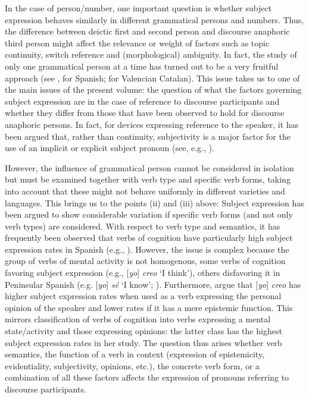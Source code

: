 \documentclass[output=paper]{langscibook}
\begin{document}
In the case of person/number, one important question is whether subject expression behaves similarly in different grammatical persons and numbers. Thus, the difference between deictic first and second person and discourse anaphoric third person might affect the relevance or weight of factors such as topic continuity, switch reference and (morphological) ambiguity. In fact, the study of only one grammatical person at a time has turned out to be a very fruitful approach (see  \citealt{LapidusOtheguy2005, TravisTorresCacoullos2012, LapidusShin2014},  for Spanish; \citealt{HerbeckForthcoming} for Valencian Catalan). This issue takes us to one of the main issues of the present volume: the question of what the factors governing subject expression are in the case of reference to discourse participants and whether they differ from those that have been observed to hold for discourse anaphoric persons. In fact, for devices expressing reference to the speaker, it has been argued that, rather than continuity, subjectivity is a major factor for the use of an implicit or explicit subject pronoun (see, e.g., \citealt{Enríquez1984, AijónOlivaSerrano2010, Posio2011,Posio2018, Hennemann2016, Herbeck2021}).



However, the influence of grammatical person cannot be considered in isolation but must be examined together with verb type and specific verb forms, taking into account that these might not behave uniformly in different varieties and languages. This brings us to the points (ii) and (iii) above: Subject expression has been argued to show considerable variation if specific verb forms (and not only verb types) are considered. With respect to verb type and semantics, it has frequently been observed that verbs of cognition have particularly high  subject expression rates in Spanish (e.g., \citealt{Enríquez1984, Morales1997, Posio2011}). However, the issue is complex because the group of verbs of mental activity is not homogenous, some verbs of cognition favoring  subject expression (e.g., [\textit{yo}] \textit{creo} ‘I think’), others disfavoring it in Peninsular Spanish (e.g. [\textit{yo}] \textit{sé}  ‘I know’; \citealt{Herbeck2021}). Furthermore, \citet{AijónOlivaSerrano2010} argue that [\textit{yo}] \textit{creo}  has higher subject expression rates when used as a verb expressing the personal opinion of the speaker and lower rates if it has a mere epistemic function. This mirrors  classification of verbs of cognition into verbs expressing a mental state/activity and those expressing opinions: the latter class has the highest  subject expression rates in her study. The question thus arises whether verb semantics, the function of a verb in context (expression of epistemicity, evidentiality, subjectivity, opinions, etc.), the concrete verb form, or a combination of all these factors affects the expression of pronouns referring to discourse participants. 
\end{document}
